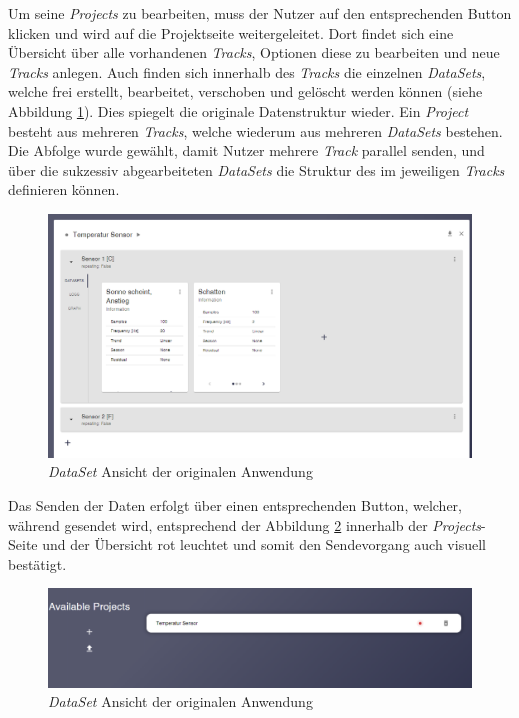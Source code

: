 Um seine \textit{Projects} zu bearbeiten, muss der Nutzer auf den entsprechenden Button klicken und wird auf die Projektseite weitergeleitet. Dort findet sich eine Übersicht über alle vorhandenen \textit{Tracks}, 
Optionen diese zu bearbeiten und neue \textit{Tracks} anlegen. Auch finden sich innerhalb des \textit{Tracks} die einzelnen \textit{DataSets}, welche frei erstellt, bearbeitet, verschoben und gelöscht werden können (siehe Abbildung \ref{fig:dataset_old_version}).
Dies spiegelt die originale Datenstruktur wieder. Ein \textit{Project} besteht aus mehreren \textit{Tracks}, welche wiederum aus mehreren \textit{DataSets} bestehen. Die Abfolge wurde gewählt, damit Nutzer mehrere \textit{Track} parallel senden, 
und über die sukzessiv abgearbeiteten \textit{DataSets} die Struktur des im jeweiligen \textit{Tracks} definieren können.

\begin{figure}[htbp]
    \centering
    \includegraphics[width=0.9\linewidth]{includes/figures/old_version/ui_old_dataset.png}
    \caption{\textit{DataSet} Ansicht der originalen Anwendung}
    \label{fig:dataset_old_version}
\end{figure}

Das Senden der Daten erfolgt über einen entsprechenden Button, welcher, während gesendet wird, entsprechend der Abbildung \ref{fig:dataset_old_sending} innerhalb der \textit{Projects}-Seite und der Übersicht rot leuchtet und somit den Sendevorgang auch visuell bestätigt.

\begin{figure}[htbp]
    \centering
    \includegraphics[width=0.9\linewidth]{includes/figures/old_version/ui_old_projects.png}
    \caption{\textit{DataSet} Ansicht der originalen Anwendung}
    \label{fig:dataset_old_sending}
\end{figure}

